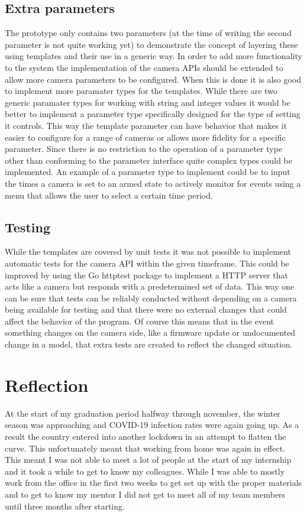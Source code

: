 \section{Extra parameters}
The prototype only contains two parameters (at the time of writing the second parameter is not quite working yet) to demonstrate the concept of layering these using templates and their use in a generic way.
In order to add more functionality to the system the implementation of the camera APIs should be extended to allow more camera parameters to be configured.
When this is done it is also good to implement more paramater types for the templates.
While there are two generic paramater types for working with string and integer values it would be better to implement a parameter type specifically designed for the type of setting it controls.
This way the template parameter can have behavior that makes it easier to configure for a range of cameras or allows more fidelity for a specific parameter.
Since there is no restriction to the operation of a parameter type other than conforming to the parameter interface quite complex types could be implemented.
An example of a parameter type to implement could be to input the times a camera is set to an armed state to actively monitor for events using a menu that allows the user to select a certain time period.

\section{Testing}
While the templates are covered by unit tests it was not possible to implement automatic tests for the camera API within the given timeframe.
This could be improved by using the Go httptest package \cite{noauthor_golang_nodate} to implement a HTTP server that acts like a camera but responds with a predetermined set of data.
This way one can be sure that tests can be reliably conducted without depending on a camera being available for testing and that there were no external changes that could affect the behavior of the program.
Of course this means that in the event something changes on the camera side, like a firmware update or undocumented change in a model, that extra tests are created to reflect the changed situation.

\chapter{Reflection}
At the start of my graduation period halfway through november, the winter season was approaching and COVID-19 infection rates were again going up.
As a result the country entered into another lockdown in an attempt to flatten the curve.
This unfortunately meant that working from home was again in effect.
This meant I was not able to meet a lot of people at the start of my internship and it took a while to get to know my colleagues.
While I was able to mostly work from the office in the first two weeks to get set up with the proper materials and to get to know my mentor I did not get to meet all of my team members until three months after starting.

